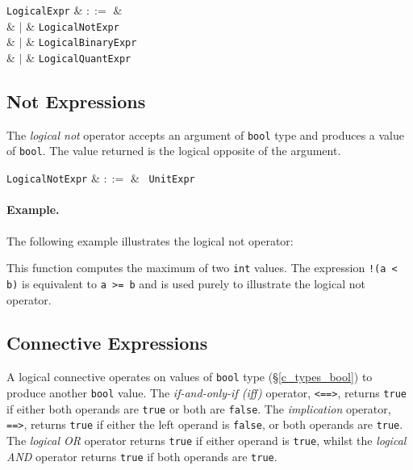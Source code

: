 \begin{syntax}
  \verb+LogicalExpr+ & $::=$ &\\
  & $|$ & \verb+LogicalNotExpr+\\
  & $|$ & \verb+LogicalBinaryExpr+\\
  & $|$ & \verb+LogicalQuantExpr+\\
\end{syntax}



\subsection{Not Expressions}
\label{c_expr_logical_not}

The {\em logical not} operator accepts an argument of \lstinline{bool} type and produces a value of \lstinline{bool}.  The value returned is the logical opposite of the argument.  

\begin{syntax}
\verb+LogicalNotExpr+ & $::=$ & \token{!}\ \verb+UnitExpr+\\
\end{syntax}

\paragraph{Example.}

The following example illustrates the logical not operator:



This function computes the maximum of two \lstinline{int} values.  The expression \lstinline{!(a < b)} is equivalent to \lstinline{a >= b} and is used purely to illustrate the logical not operator.


\subsection{Connective Expressions}
\label{c_expr_logical_connectives}

A logical connective operates on values of \lstinline{bool} type (\S\ref{c_types_bool}) to produce another \lstinline{bool} value.  The {\em if-and-only-if (iff)} operator, \lstinline{<==>}, returns \lstinline{true} if either both operands are \lstinline{true} or both are \lstinline{false}.  The {\em implication} operator, \lstinline{==>}, returns \lstinline{true} if either the left operand is \lstinline{false}, or both operands are \lstinline{true}.  The {\em logical OR} operator returns \lstinline{true} if either operand is \lstinline{true}, whilst the {\em logical AND} operator returns \lstinline{true} if both operands are \lstinline{true}.

